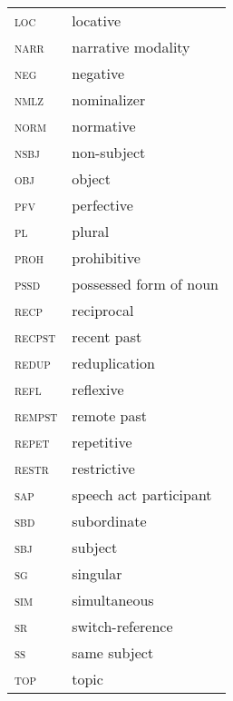 \documentclass[output=paper]{langscibook}
\begin{document}
\begin{tabularx}{.45\textwidth}[t]{lQ}
\textsc{loc}  &  locative\\
\textsc{narr}  &  narrative modality\\
\textsc{neg}  &  negative\\
\textsc{nmlz}  &  nominalizer\\
\textsc{norm}  &  normative\\
\textsc{nsbj}  &  non-subject\\
\textsc{obj}  &  object\\
\textsc{pfv}  &  perfective\\
\textsc{pl}  &  plural\\
\textsc{proh}  &  prohibitive\\
\textsc{pssd}  &  possessed form of noun\\
\textsc{recp}  &  reciprocal\\
\textsc{recpst}  &  recent past\\
\textsc{redup}  &  reduplication\\
\textsc{refl}  &  reflexive\\
\textsc{rempst}  &  remote past\\
\textsc{repet}  &  repetitive\\
\textsc{restr}  &  restrictive\\
\textsc{sap}  &  speech act participant\\
\textsc{sbd}  &  subordinate\\
\textsc{sbj}  &  subject\\
\textsc{sg}  &  singular\\
\textsc{sim}  &  simultaneous\\
\textsc{sr}  &  switch-reference\\
\textsc{ss}  &  same subject\\
\textsc{top} & topic
\end{tabularx}

\sloppy\printbibliography[heading=subbibliography,notkeyword=this]
\end{document}

